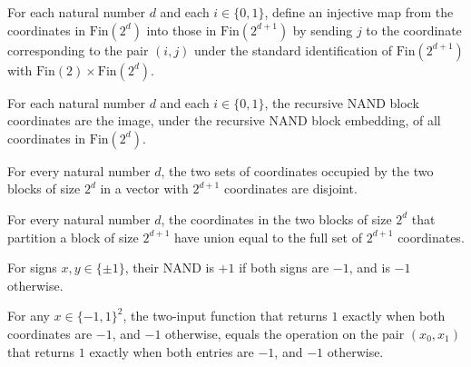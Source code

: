 \begin{definition}
\label{FABL.recursiveNandBlockEmbedding}
\leanok
For each natural number $d$ and each $i\in\{0,1\}$, define an injective map from the
coordinates in $\mathrm{Fin}(2^d)$ into those in $\mathrm{Fin}(2^{d+1})$ by sending $j$
to the coordinate corresponding to the pair $(i,j)$ under the standard identification of
$\mathrm{Fin}(2^{d+1})$ with $\mathrm{Fin}(2)\times\mathrm{Fin}(2^d)$.
\end{definition}

\begin{definition}
\label{FABL.recursiveNandBlockCoordinates}
\leanok
{}
For each natural number $d$ and each $i\in\{0,1\}$, the recursive NAND block coordinates
are the image, under the recursive NAND block embedding, of all coordinates in
$\mathrm{Fin}(2^d)$.
\end{definition}

\begin{theorem}
\label{FABL.recursiveNandBlockCoordinates_disjoint}
\leanok
{}
For every natural number $d$, the two sets of coordinates occupied by the two blocks of
size $2^d$ in a vector with $2^{d+1}$ coordinates are disjoint.
\end{theorem}

\begin{theorem}
\label{FABL.recursiveNandBlockCoordinates_union}
\leanok
{}
For every natural number $d$, the coordinates in the two blocks of size $2^d$ that
partition a block of size $2^{d+1}$ have union equal to the full set of $2^{d+1}$
coordinates.
\end{theorem}

\begin{definition}
\label{FABL.nandPair}
\leanok
{}
For signs $x,y\in\{\pm1\}$, their NAND is $+1$ if both signs are $-1$, and is $-1$
otherwise.
\end{definition}

\begin{theorem}
\label{FABL.nandFunction_eq_nandPair}
\leanok
{}
For any $x\in\{-1,1\}^2$, the two-input function that returns $1$ exactly when both
coordinates are $-1$, and $-1$ otherwise, equals the operation on the pair $(x_0,x_1)$
that returns $1$ exactly when both entries are $-1$, and $-1$ otherwise.
\end{theorem}

